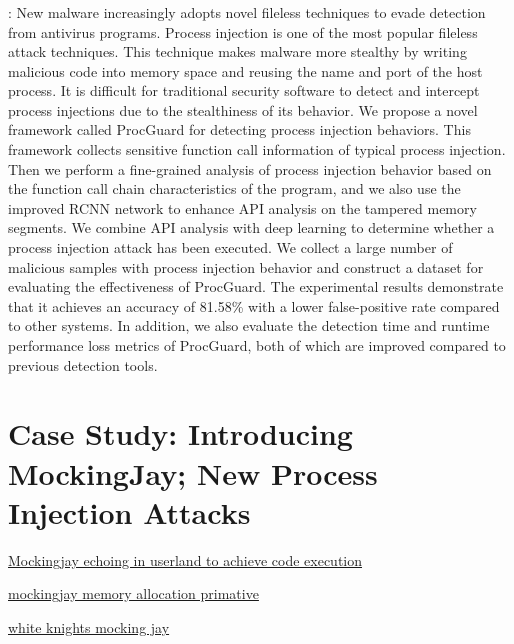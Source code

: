 \documentclass{article}
\begin{document}
\subsubsection{\textcite{Wang:2022}}
\textbf{}: New malware increasingly adopts novel fileless techniques to evade detection from antivirus programs. Process injection is one of the most popular fileless attack techniques. This technique makes malware more stealthy by writing malicious code into memory space and reusing the name and port of the host process. It is difficult for traditional security software to detect and intercept process injections due to the stealthiness of its behavior. We propose a novel framework called ProcGuard for detecting process injection behaviors. This framework collects sensitive function call information of typical process injection. Then we perform a fine-grained analysis of process injection behavior based on the function call chain characteristics of the program, and we also use the improved RCNN network to enhance API analysis on the tampered memory segments. We combine API analysis with deep learning to determine whether a process injection attack has been executed. We collect a large number of malicious samples with process injection behavior and construct a dataset for evaluating the effectiveness of ProcGuard. The experimental results demonstrate that it achieves an accuracy of 81.58\% with a lower false-positive rate compared to other systems. In addition, we also evaluate the detection time and runtime performance loss metrics of ProcGuard, both of which are improved compared to previous detection tools.

\section{Case Study: Introducing MockingJay; New Process Injection Attacks}

\href{https://www.securityjoes.com/post/process-mockingjay-echoing-rwx-in-userland-to-achieve-code-execution}{Mockingjay echoing in userland to achieve code execution}

\href{https://www.linkedin.com/posts/john-stigerwalt-90a9b4110_mockingjay-memory-allocation-primitive-activity-7083050050158743552-Hgyw}{mockingjay memory allocation primative}

\href{https://whiteknightlabs.com/2023/07/06/mockingjay-memory-allocation-primitive/}{white knights mocking jay}
\end{document}
